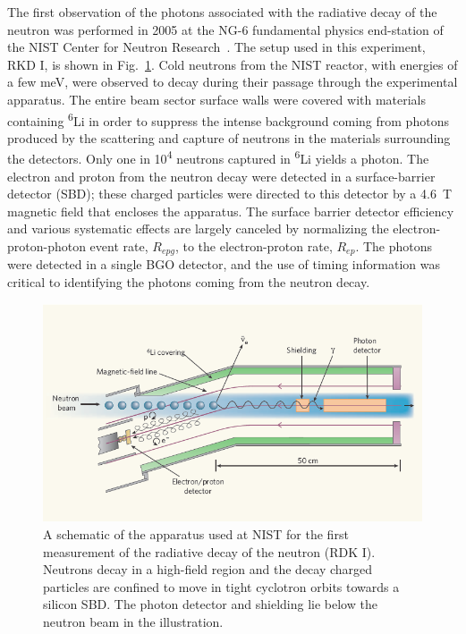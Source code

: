 \documentclass[oneside,12pt]{memoir}
\begin{document}
The first observation of the photons associated with the radiative decay of the neutron was performed in 2005 at the NG-6 fundamental physics end-station of the NIST Center for Neutron Research~\cite{rdk1nature,rdk1prc}. The setup used in this experiment, RKD I, is shown in Fig.~\ref{fig:rdk1diagram}. Cold neutrons from the NIST reactor, with energies of a few meV, were observed to decay during their passage through the experimental apparatus. The entire beam sector surface walls were covered with materials containing \textsuperscript{6}Li in order to suppress the intense background coming from photons produced by the scattering and capture of neutrons in the materials surrounding the detectors. Only one in 10\textsuperscript{4} neutrons captured in \textsuperscript{6}Li yields a photon. The electron and proton from the neutron decay were detected in a surface-barrier detector (SBD); these charged particles were directed to this detector by a 4.6~T magnetic field that encloses the apparatus. The surface barrier detector efficiency and various systematic effects are largely canceled by normalizing the electron-proton-photon event rate, $R_{epg}$, to the electron-proton rate, $R_{ep}$. The photons were detected in a single BGO detector, and the use of timing information was critical to identifying the photons coming from the neutron decay.\par
\begin{figure}[t]
\includegraphics[width=\linewidth]{rdk1diagram.png}
\caption[A schematic of the RDK I experiment.]{A schematic of the apparatus used at NIST for the first measurement of the radiative decay of the neutron (RDK I). Neutrons decay in a high-field region and the decay charged particles are confined to move in tight cyclotron orbits towards a silicon SBD. The photon detector and shielding lie below the neutron beam in the illustration.}
\label{fig:rdk1diagram}
\end{figure}
\end{document}
